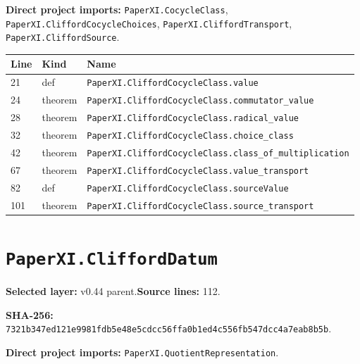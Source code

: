 \documentclass[10pt,oneside]{book}
\begin{document}
\textbf{Direct project imports:} \nolinkurl{PaperXI.CocycleClass}, \nolinkurl{PaperXI.CliffordCocycleChoices}, \nolinkurl{PaperXI.CliffordTransport}, \nolinkurl{PaperXI.CliffordSource}.

\begin{longtable}{@{}p{}p{}p{}@{}}\toprule Line&Kind&Name\\\midrule\endhead

21&def&\nolinkurl{PaperXI.CliffordCocycleClass.value}\\

24&theorem&\nolinkurl{PaperXI.CliffordCocycleClass.commutator_value}\\

28&theorem&\nolinkurl{PaperXI.CliffordCocycleClass.radical_value}\\

32&theorem&\nolinkurl{PaperXI.CliffordCocycleClass.choice_class}\\

42&theorem&\nolinkurl{PaperXI.CliffordCocycleClass.class_of_multiplication}\\

67&theorem&\nolinkurl{PaperXI.CliffordCocycleClass.value_transport}\\

82&def&\nolinkurl{PaperXI.CliffordCocycleClass.sourceValue}\\

101&theorem&\nolinkurl{PaperXI.CliffordCocycleClass.source_transport}\\

\bottomrule\end{longtable}

\section{\texorpdfstring{\nolinkurl{PaperXI.CliffordDatum}}{PaperXI.CliffordDatum}}\label{module:PaperXI.CliffordDatum}

\textbf{Selected layer:} v0.44 parent.\quad\textbf{Source lines:} 112.\par\textbf{SHA-256:} {\scriptsize\nolinkurl{7321b347ed121e9981fdb5e48e5cdcc56ffa0b1ed4c556fb547dcc4a7eab8b5b}}.


\textbf{Direct project imports:} \nolinkurl{PaperXI.QuotientRepresentation}.
\end{document}
